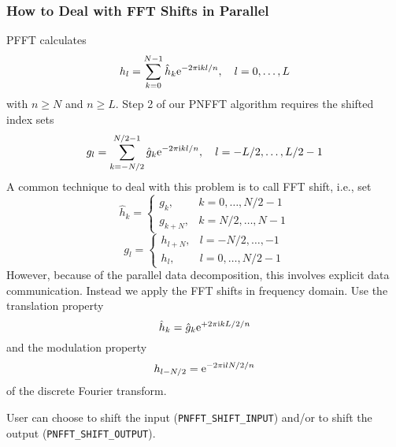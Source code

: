 \documentclass[a4paper,11pt,final,openright,headsepline]{scrreprt}
\numberwithin{figure}{chapter}
\numberwithin{table}{chapter}
\numberwithin{equation}{chapter}
\begin{document}
\subsubsection*{How to Deal with FFT Shifts in Parallel}
PFFT calculates
\begin{equation*}
  h_l = \sum_{k=0}^{N-1} \hat h_k \mathrm{e}^{-2\pi{\ensuremath{\text{\scriptsize{i}}}} kl/n},
  \quad l=0,\hdots,L
\end{equation*}
with $n\ge N$ and $n\ge L$.
Step 2 of our PNFFT algorithm requires the shifted index sets
\begin{equation*}
  g_l = \sum_{k=-N/2}^{N/2-1} \hat g_k \mathrm{e}^{-2\pi{\ensuremath{\text{\scriptsize{i}}}} kl/n},
  \quad l=-L/2,\hdots,L/2-1
\end{equation*}
A common technique to deal with this problem is to call FFT shift, i.e., set
\begin{equation*}
  \hat h_k
  =
  \begin{cases}
    g_k,     & k=0,\hdots,N/2-1 \\
    g_{k+N}, & k=N/2,\hdots,N-1
  \end{cases}
\end{equation*}
\begin{equation*}
  g_l
  =
  \begin{cases}
    h_{l+N}, & l=-N/2,\hdots,-1 \\
    h_l,     & l=0,\hdots,N/2-1
  \end{cases}
\end{equation*}
However, because of the parallel data decomposition, this involves explicit data communication.
Instead we apply the FFT shifts in frequency domain.
Use the translation property
\begin{equation*}
  \hat h_k = \hat g_k \mathrm{e}^{+2\pi{\ensuremath{\text{\scriptsize{i}}}} kL/2/n}
\end{equation*}
and the modulation property
\begin{equation*}
  h_{l-N/2} = \mathrm{e}^{-2\pi{\ensuremath{\text{\scriptsize{i}}}} lN/2/n}
\end{equation*}
of the discrete Fourier transform.

User can choose to shift the input (\verb+PNFFT_SHIFT_INPUT+) and/or to shift the output (\verb+PNFFT_SHIFT_OUTPUT+).
\end{document}
